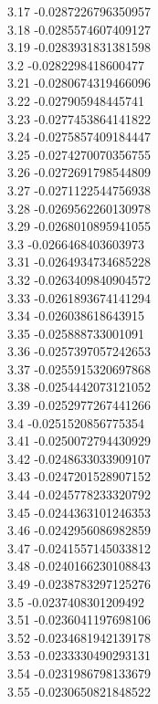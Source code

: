 {3.17	-0.0287226796350957\\
3.18	-0.0285574607409127\\
3.19	-0.0283931831381598\\
3.2	-0.0282298418600477\\
3.21	-0.0280674319466096\\
3.22	-0.027905948445741\\
3.23	-0.0277453864141822\\
3.24	-0.0275857409184447\\
3.25	-0.0274270070356755\\
3.26	-0.0272691798544809\\
3.27	-0.0271122544756938\\
3.28	-0.0269562260130978\\
3.29	-0.0268010895941055\\
3.3	-0.0266468403603973\\
3.31	-0.0264934734685228\\
3.32	-0.0263409840904572\\
3.33	-0.0261893674141294\\
3.34	-0.026038618643915\\
3.35	-0.025888733001091\\
3.36	-0.0257397057242653\\
3.37	-0.0255915320697868\\
3.38	-0.0254442073121052\\
3.39	-0.0252977267441266\\
3.4	-0.0251520856775354\\
3.41	-0.0250072794430929\\
3.42	-0.0248633033909107\\
3.43	-0.0247201528907152\\
3.44	-0.0245778233320792\\
3.45	-0.0244363101246353\\
3.46	-0.0242956086982859\\
3.47	-0.0241557145033812\\
3.48	-0.0240166230108843\\
3.49	-0.0238783297125276\\
3.5	-0.0237408301209492\\
3.51	-0.0236041197698106\\
3.52	-0.0234681942139178\\
3.53	-0.0233330490293131\\
3.54	-0.0231986798133679\\
3.55	-0.0230650821848522\\
}
